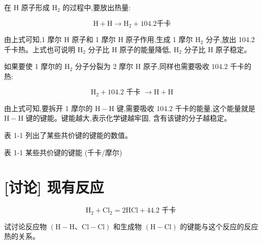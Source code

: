 \documentclass[10pt]{article}
\begin{document}
在 \(\mathrm{H}\) 原子形成 \({\mathrm{H}}_{2}\) 的过程中,要放出热量:

\[
\mathrm{H} + \mathrm{H} \rightarrow {\mathrm{H}}_{2} + {104.2}\text{千卡}
\]

由上式可知,1 摩尔 \(\mathrm{H}\) 原子和 1 摩尔 \(\mathrm{H}\) 原子作用,生成 1 摩尔 \({\mathrm{H}}_{2}\) 分子,放出 104.2 千卡热。上式也可说明 \({\mathrm{H}}_{2}\) 分子比 \(\mathrm{H}\) 原子的能量降低, \({\mathrm{H}}_{2}\) 分子比 \(\mathrm{H}\) 原子稳定。

如果要使 1 摩尔的 \({\mathrm{H}}_{2}\) 分子分裂为 2 摩尔 \(\mathrm{H}\) 原子,同样也需要吸收 104.2 千卡的热:

\[
{\mathrm{H}}_{2} + {104.2}\text{ 千卡 } \rightarrow \mathrm{H} + \mathrm{H}
\]

由上式可知,要拆开 1 摩尔的 \(\mathrm{H} - \mathrm{H}\) 键,需要吸收 104.2 千卡的能量,这个能量就是 \(\mathrm{H} - \mathrm{H}\) 键的键能。键能越大,表示化学键越牢固, 含有该键的分子越稳定。

表 1-1 列出了某些共价键的键能的数值。

表 1-1 某些共价键的键能 (千卡/摩尔)

\begin{center}
\end{center}

\section*{[讨论] 现有反应}

\[
{\mathrm{H}}_{2} + {\mathrm{{Cl}}}_{2} = 2\mathrm{{HCl}} + {44.2}\text{ 千卡 }
\]

试讨论反应物 \(\left( {\mathrm{H} - \mathrm{H}\text{、}\mathrm{{Cl}} - \mathrm{{Cl}}}\right)\) 和生成物 \(\left( {\mathrm{H} - \mathrm{{Cl}}}\right)\) 的键能与这个反应的反应热的关系。
\end{document}
